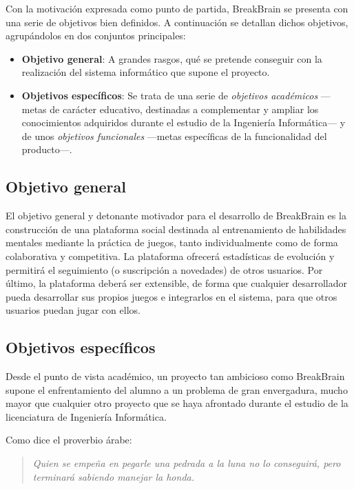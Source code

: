 Con la motivación expresada como punto de partida, BreakBrain se presenta con una serie de objetivos bien definidos. A continuación se detallan dichos objetivos, agrupándolos en dos conjuntos principales:

\begin{itemize}
\item {\bf Objetivo general}: A grandes rasgos, qué se pretende conseguir con la realización del sistema informático que supone el proyecto.
\item {\bf Objetivos específicos}: Se trata de una serie de {\it objetivos académicos} ---metas de carácter educativo, destinadas a complementar y ampliar los conocimientos adquiridos durante el estudio de la Ingeniería Informática--- y de unos {\it objetivos funcionales} ---metas específicas de la funcionalidad del producto---.
\end{itemize}

\subsection{Objetivo general}

El objetivo general y detonante motivador para el desarrollo de BreakBrain es la construcción de una plataforma social destinada al entrenamiento de habilidades mentales mediante la práctica de juegos, tanto individualmente como de forma colaborativa y competitiva. La plataforma ofrecerá estadísticas de evolución y permitirá el seguimiento (o suscripción a novedades) de otros usuarios. Por último, la plataforma deberá ser extensible, de forma que cualquier desarrollador pueda desarrollar sus propios juegos e integrarlos en el sistema, para que otros usuarios puedan jugar con ellos.

\subsection{Objetivos específicos}

Desde el punto de vista académico, un proyecto tan ambicioso como BreakBrain supone el enfrentamiento del alumno a un problema de gran envergadura, mucho mayor que cualquier otro proyecto que se haya afrontado durante el estudio de la licenciatura de Ingeniería Informática.

Como dice el proverbio árabe:

\begin{quote}
{\it Quien se empeña en pegarle una pedrada a la luna no lo conseguirá, pero terminará sabiendo manejar la honda.}
\end{quote}

